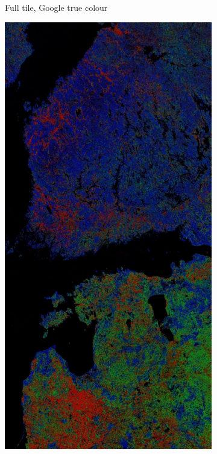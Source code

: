 \documentclass[a4paper,12pt]{scrbook}
\begin{document}
\begin{figure}
\begin{subfigure}[t]{.24\textwidth}
    \caption{Full tile, Google true colour}
  \end{subfigure} \hfill
  \begin{subfigure}[t]{.24\textwidth}
    \includegraphics[width=\textwidth]{thesis-figures/figures-qgis/fulltile-rf}

\end{subfigure}
\end{figure}
\end{document}
